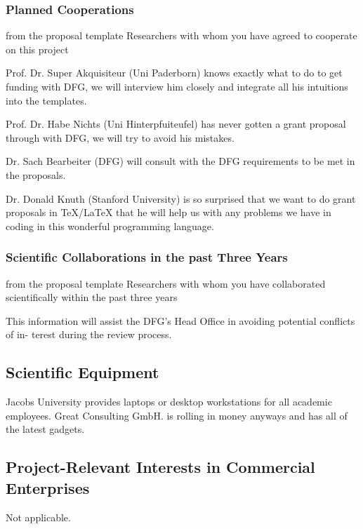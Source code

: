 \subsubsection{Planned Cooperations}\label{sec:coop:planned}
\begin{todo}{from the proposal template}
  Researchers with whom you have agreed to cooperate on this project
\end{todo}
\begin{compactdesc}
\item[Prof. Dr. Super Akquisiteur (Uni Paderborn)] knows exactly what to do to get funding
  with DFG, we will interview him closely and integrate all his intuitions into the {\pn}
  templates.
\item[Prof. Dr. Habe Nichts (Uni Hinterpfuiteufel)] has never gotten a grant proposal
  through with DFG, we will try to avoid his mistakes.
\item[Dr. Sach Bearbeiter (DFG)] will consult with the DFG requirements to be met in the
  proposals.
\item[Dr. Donald Knuth (Stanford University)] is so surprised that we want to do grant
  proposals in {\TeX/\LaTeX} that he will help us with any problems we have in coding in
  this wonderful programming language.
\end{compactdesc}

\subsubsection{Scientific Collaborations in the past Three Years}\label{sec:past-coop}

\begin{todo}{from the proposal template}
  Researchers with whom you have collaborated scientifically within the past three years

  This information will assist the DFG’s Head Office in avoiding potential conflicts of
  in- terest during the review process.
\end{todo}

\subsection{Scientific Equipment}\label{sec:req:equipment}

Jacobs University provides laptops or desktop workstations for all academic
employees. Great Consulting GmbH. is rolling in money anyways and has all of the latest
gadgets.


\subsection{Project-Relevant Interests in Commercial Enterprises}

Not applicable.


